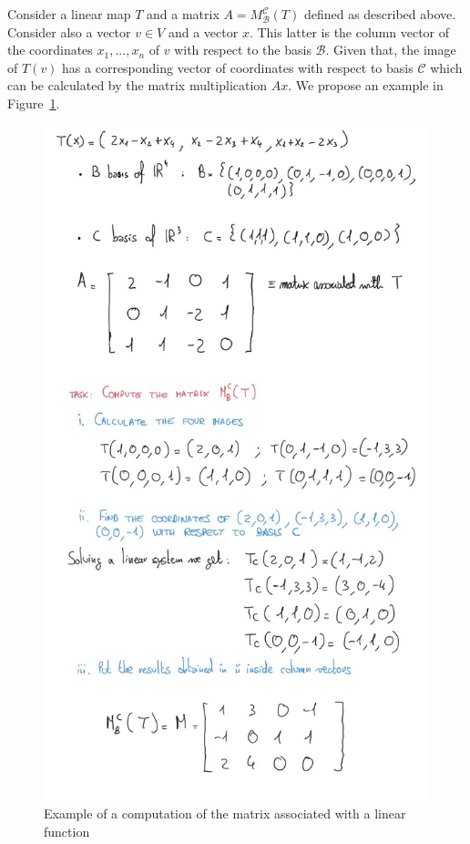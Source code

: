 Consider a linear map $T$ and a matrix $A=M^{\mathcal{C}}_{\mathcal{B}}(T)$
defined as described above. Consider also a vector $v \in V$ and a vector $x$.
This latter is the column vector of the coordinates $x_{1},...,x_{n}$ of $v$
with respect to the basis $\mathcal{B}$. Given that, the image of $T(v)$ has a
corresponding vector of coordinates with respect to basis $\mathcal{C}$ which
can be calculated by the matrix multiplication $Ax$. We propose an example in Figure~\ref{fig:linear_function_matrix}.
\begin{figure}[H]
	\centering
	\includegraphics[scale=0.60]{images/04_LinearAlgebra_matrixLinearFunction.jpg}
	\caption{Example of a computation of the matrix associated with a linear
	function}
	\label{fig:linear_function_matrix}
\end{figure}

